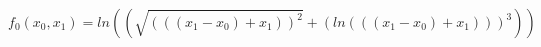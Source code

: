 \documentclass{article}
\begin{document}
\begin{equation}
f_0(x_0,x_1)=ln(\left( \sqrt{ (\left(\left(x_1 - x_0\right) + x_1\right) )^2 } +  (ln(\left(\left(x_1 - x_0\right) + x_1\right)) )^3\right))
\end{equation}
\end{document}
